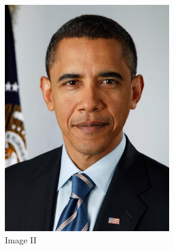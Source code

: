 \documentclass[a4paper]{article}
\begin{document}
{\begin{figure}[H]
\begin{subfigure}[b]{0.2\linewidth}
			\includegraphics[width=\linewidth]{images/Picture3.png}
			\caption*{Image II}
		\end{subfigure}
		\begin{subfigure}[b]{0.2\linewidth}

\end{subfigure}
\end{figure}}
\end{document}

